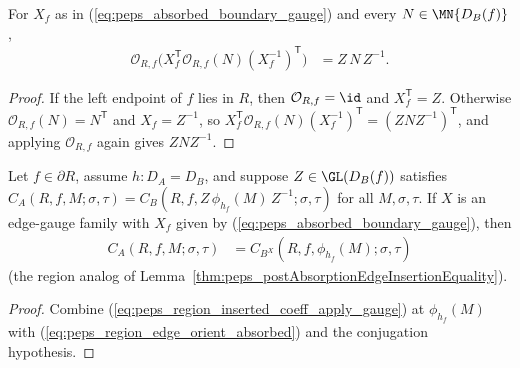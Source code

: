 \begin{lemma}%
    \label{thm:peps_regionEdgeOrient_absorbedBoundaryGauge}
    \leanok
    For $X_f$ as in (\ref{eq:peps_absorbed_boundary_gauge}) and every $N\in\MN{D_B(f)}$,
    \begin{align}
        \mathcal O_{R,f}\bigl(X_f^{\mathsf T} \mathcal O_{R,f}(N)
        (X_f^{-1})^{\mathsf T}\bigr)
         & =
        Z\,N\,Z^{-1}.
        \label{eq:peps_region_edge_orient_absorbed}
    \end{align}
\end{lemma}
\begin{proof}\leanok
    If the left endpoint of $f$ lies in $R$, then $\mathcal O_{R,f}=\id$ and $X_f^{\mathsf T}=Z$. Otherwise $\mathcal O_{R,f}(N)=N^{\mathsf T}$ and $X_f=Z^{-1}$, so $X_f^{\mathsf T}\mathcal O_{R,f}(N)(X_f^{-1})^{\mathsf T}=(ZNZ^{-1})^{\mathsf T}$, and applying $\mathcal O_{R,f}$ again gives $ZNZ^{-1}$.
\end{proof}

\begin{lemma}%
    \label{thm:peps_regionInsertedCoeff_eq_applyGauge_of_conjIdentity}
    \leanok
    Let $f\in\partial R$, assume $h:D_A=D_B$, and suppose $Z\in\GL(D_B(f))$ satisfies $C_A(R,f,M;\sigma,\tau)=C_B(R,f,Z\,\phi_{h_f}(M)\,Z^{-1};\sigma,\tau)$ for all $M,\sigma,\tau$. If $X$ is an edge-gauge family with $X_f$ given by (\ref{eq:peps_absorbed_boundary_gauge}), then
    \begin{align}
        C_A(R,f,M;\sigma,\tau)
         & =
        C_{B^X}(R,f,\phi_{h_f}(M);\sigma,\tau)
        \label{eq:peps_region_absorbed_equality}
    \end{align}
    (the region analog of Lemma~\ref{thm:peps_postAbsorptionEdgeInsertionEquality}).
\end{lemma}
\begin{proof}\leanok
    Combine (\ref{eq:peps_region_inserted_coeff_apply_gauge}) at $\phi_{h_f}(M)$ with (\ref{eq:peps_region_edge_orient_absorbed}) and the conjugation hypothesis.
\end{proof}

